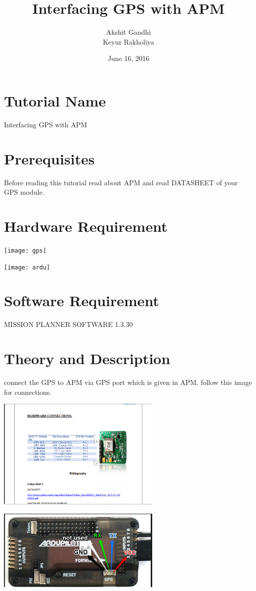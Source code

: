 \documentclass[11pt,a4paper]{article}
\title{Interfacing GPS with APM}
\author{Akshit Gandhi \\ Keyur Rakholiya}
\date{June 16, 2016}
\begin{document}
	\maketitle
	\newpage
	\tableofcontents
	\newpage
	\section{Tutorial Name}
	Interfacing GPS with APM
	\section{Prerequisites}
	Before reading this tutorial read about APM and read DATASHEET of your GPS module.
	\section{Hardware Requirement}
	\begin{center}
	\texttt{[image: gps]}
	
	
	\texttt{[image: ardu]}
	\end{center}
	\newpage
	\section{Software Requirement}

	MISSION PLANNER SOFTWARE 1.3.30

	\section{Theory and Description}
		connect the GPS to APM via GPS port which is given in APM.
		follow this image for connections.
		\begin{center}

		\includegraphics[width = 300px]{gps2}
		
		\includegraphics[width = 300px]{ardu2}
		\end{center}
		
\end{document}
